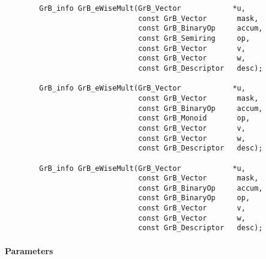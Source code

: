 \begin{verbatim}
        GrB_info GrB_eWiseMult(GrB_Vector            *u,
                               const GrB_Vector       mask,
                               const GrB_BinaryOp     accum,
                               const GrB_Semiring     op, 
                               const GrB_Vector       v,
                               const GrB_Vector       w,
                               const GrB_Descriptor   desc);
                            
        GrB_info GrB_eWiseMult(GrB_Vector            *u,
                               const GrB_Vector       mask,
                               const GrB_BinaryOp     accum,
                               const GrB_Monoid       op, 
                               const GrB_Vector       v,
                               const GrB_Vector       w,
                               const GrB_Descriptor   desc);
                            
        GrB_info GrB_eWiseMult(GrB_Vector            *u,
                               const GrB_Vector       mask,
                               const GrB_BinaryOp     accum,
                               const GrB_BinaryOp     op, 
                               const GrB_Vector       v,
                               const GrB_Vector       w,
                               const GrB_Descriptor   desc);
\end{verbatim}

\paragraph{Parameters}

